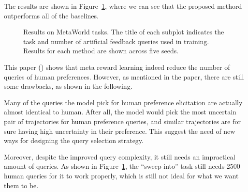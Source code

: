 \documentclass[
  letterpaper,
  numbers=noenddot,
  DIV=11]{scrreprt}
\theoremstyle{definition}
\theoremstyle{plain}
\theoremstyle{plain}
\theoremstyle{remark}
\begin{document}
The results are shown in Figure~\ref{fig-few-exp}, where we can see that
the proposed methord outperforms all of the baselines.

\begin{figure}


\caption{\label{fig-few-exp}Results on MetaWorld tasks. The title of
each subplot indicates the task and number of artificial feedback
queries used in training. Results for each method are shown across five
seeds.}

\end{figure}%

This paper ()
shows that meta reward learning indeed reduce the number of queries of
human preferences. However, as mentioned in the paper, there are still
some drawbacks, as shown in the following.

Many of the queries the model pick for human preference elicitation are
actually almost identical to human. After all, the model would pick the
most uncertain pair of trajectories for human preference queries, and
similar trajectories are for sure having high uncertainty in their
preference. This suggest the need of new ways for designing the query
selection strategy.

Moreover, despite the improved query complexity, it still needs an
impractical amount of queries. As shown in Figure~\ref{fig-few-exp}, the
``sweep into'' task still needs 2500 human queries for it to work
properly, which is still not ideal for what we want them to be.
\end{document}
